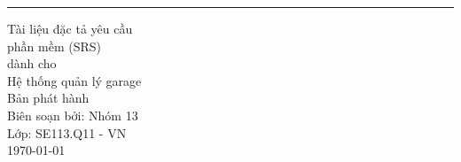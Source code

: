 \documentclass[../main.tex]{subfiles}
\begin{document}
\begin{flushright}
    \rule{\linewidth}{5pt}\vskip1cm
    \begin{bfseries}
        \Huge{Tài liệu đặc tả yêu cầu\\ phần mềm (SRS)}\\
        \vspace{1.5cm}
        dành cho\\
        \vspace{1.5cm}
        Hệ thống quản lý garage\\
        \vspace{1.5cm}
        \LARGE{Bản phát hành \myversion}\\
        \vspace{1.5cm}
        Biên soạn bởi: Nhóm 13\\ Lớp: SE113.Q11 - VN\\
        \vspace{1.5cm}
        \today\\
    \end{bfseries}
\end{flushright}
\end{document}
